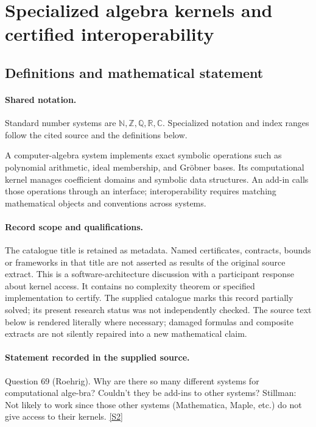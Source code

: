 \documentclass[11pt]{article}
\newcommand{\sref}[2]{\hyperlink{source:#1:#2}{[S#2]}}
\begin{document}
\section{Specialized algebra kernels and certified interoperability}\label{statement}

\subsection{Definitions and mathematical statement}

\paragraph{Shared notation.}Standard number systems are $\mathbb N,\mathbb Z,\mathbb Q,\mathbb R,\mathbb C$. Specialized notation and index ranges follow the cited source and the definitions below.


A computer-algebra system implements exact symbolic operations such as polynomial arithmetic, ideal membership, and Gröbner bases. Its computational kernel manages coefficient domains and symbolic data structures. An add-in calls those operations through an interface; interoperability requires matching mathematical objects and conventions across systems.
\paragraph{Record scope and qualifications.}
The catalogue title is retained as metadata. Named certificates, contracts, bounds or frameworks in that title are not asserted as results of the original source extract.
This is a software-architecture discussion with a participant response about kernel access. It contains no complexity theorem or specified implementation to certify. The supplied catalogue marks this record partially solved; its present research status was not independently checked.
The source text below is rendered literally where necessary; damaged formulas and composite extracts are not silently repaired into a new mathematical claim.
\paragraph{Statement recorded in the supplied source.}
Question 69 (Roehrig). Why are there so many different systems for computational alge-bra? Couldn't they be add-ins to other systems? Stillman: Not likely to work since those other systems (Mathematica, Maple, etc.) do not give access to their kernels. \sref{statement}{2}
\end{document}
